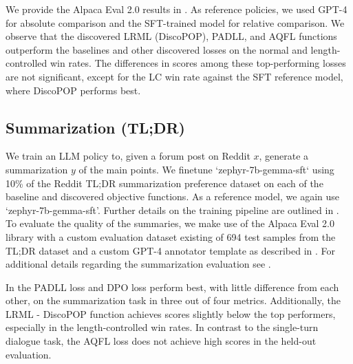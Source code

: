 \documentclass{article}
\theoremstyle{plain}
\theoremstyle{definition}
\theoremstyle{remark}
\begin{document}
We provide the Alpaca Eval 2.0 results in . As reference policies, we used GPT-4 for absolute comparison and the SFT-trained model for relative comparison. We observe that the discovered LRML (DiscoPOP), PADLL, and AQFL functions outperform the baselines and other discovered losses on the normal and length-controlled win rates. The differences in scores among these top-performing losses are not significant, except for the LC win rate against the SFT reference model, where DiscoPOP performs best.

\subsection{Summarization (TL;DR)}

We train an LLM policy to, given a forum post on Reddit $x$, generate a summarization $y$ of the main points. We finetune `zephyr-7b-gemma-sft` using 10\% of the Reddit TL;DR summarization preference dataset \citep{volske2017tl} on each of the baseline and discovered objective functions. As a reference model, we again use `zephyr-7b-gemma-sft'. Further details on the training pipeline are outlined in . To evaluate the quality of the summaries, we make use of the Alpaca Eval 2.0 library with a custom evaluation dataset existing of 694 test samples from the TL;DR dataset and a custom GPT-4 annotator template as described in \citet{rafailov2023direct}. For additional details regarding the summarization evaluation see .

In  the PADLL loss and DPO loss perform best, with little difference from each other, on the summarization task in three out of four metrics. Additionally, the LRML - DiscoPOP function achieves scores slightly below the top performers, especially in the length-controlled win rates. In contrast to the single-turn dialogue task, the AQFL loss does not achieve high scores in the held-out evaluation.
\end{document}
